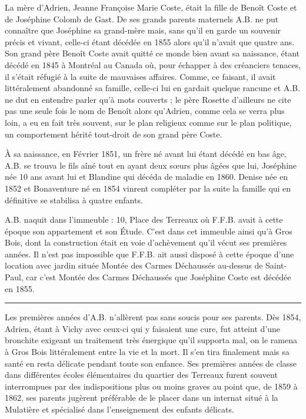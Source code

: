 \documentclass[11pt,a4paper]{report}
\begin{document}
La mère d'Adrien, Jeanne Françoise Marie Coste, était la fille de Benoît Coste et de Joséphine Colomb de Gast. De ses grands parents maternels A.B. ne put connaître que Joséphine sa grand-mère mais, sans qu'il en garde un souvenir précis et vivant, celle-ci étant décédée en 1855 alors qu'il n'avait que quatre ans. Son grand père Benoît Coste avait quitté ce monde bien avant sa naissance, étant décédé en 1845 à Montréal au Canada où, pour échapper à des créanciers tenaces, il s'était réfugié à la suite de mauvaises affaires. Comme, ce faisant, il avait littéralement abandonné sa famille, celle-ci lui en gardait quelque rancune et A.B. ne dut en entendre parler qu'à mots couverts ; le père Rosette d'ailleurs ne cite pas une seule fois le nom de Benoît alors qu'Adrien, comme cela se verra plus loin, a eu en fait très souvent, sur le plan religieux comme sur le plan politique, un comportement hérité tout-droit de son grand père Coste.


À sa naissance, en Février 1851, un frère né avant lui étant décédé en bas âge, A.B. se trouva le fils aîné tout en ayant deux sœurs plus âgées que lui, Joséphine née 10 ans avant lui et Blandine qui décéda de maladie en 1860. Denise née en 1852 et Bonaventure né en 1854 vinrent compléter par la suite la famille qui en définitive se stabilisa à quatre enfants.

A.B. naquit dans l'immeuble : 10, Place des Terreaux où F.F.B. avait à cette époque son appartement et son Étude. C'est dans cet immeuble ainsi qu'à Gros Bois, dont la construction était en voie d'achèvement qu'il vécut ses premières années. Il n'est pas impossible que F.F.B. ait aussi disposé à cette époque d'une location avec jardin située Montée des Carmes Déchaussés au-dessus de Saint-Paul, car c'est Montée des Carmes Déchaussés que Joséphine Coste est décédée en 1855.

\begin{center}\rule{0.5\linewidth}{0.5pt}\end{center}

Les premières années d'A.B. n'allèrent pas sans soucis pour ses parents. Dès 1854, Adrien, étant à Vichy avec ceux-ci qui y faisaient une cure, fut atteint d'une bronchite exigeant un traitement très énergique qu'il supporta mal, on le ramena à Gros Bois littéralement entre la vie et la mort. Il s'en tira finalement mais sa santé en resta délicate pendant toute son enfance. Ses premières années de classe dans différentes écoles élémentaires du quartier des Terreaux furent souvent interrompues par des indispositions plus ou moins graves au point que, de 1859 à 1862, ses parents jugèrent préférable de le placer dans un internat situé à la Mulatière et spécialisé dans l'enseignement des enfants délicats.
\end{document}
